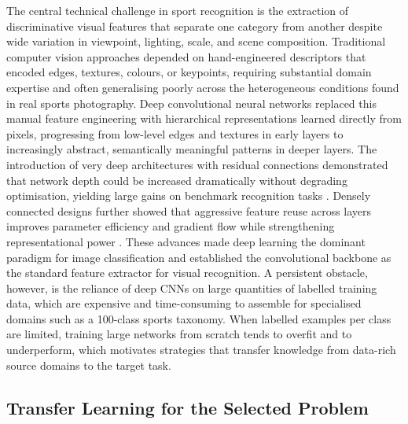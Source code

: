 The central technical challenge in sport recognition is the extraction of discriminative visual features that separate one category from another despite wide variation in viewpoint, lighting, scale, and scene composition.
Traditional computer vision approaches depended on hand-engineered descriptors that encoded edges, textures, colours, or keypoints, requiring substantial domain expertise and often generalising poorly across the heterogeneous conditions found in real sports photography.
Deep convolutional neural networks replaced this manual feature engineering with hierarchical representations learned directly from pixels, progressing from low-level edges and textures in early layers to increasingly abstract, semantically meaningful patterns in deeper layers.
The introduction of very deep architectures with residual connections demonstrated that network depth could be increased dramatically without degrading optimisation, yielding large gains on benchmark recognition tasks \citep{he2016resnet}.
Densely connected designs further showed that aggressive feature reuse across layers improves parameter efficiency and gradient flow while strengthening representational power \citep{huang2017densenet}.
These advances made deep learning the dominant paradigm for image classification and established the convolutional backbone as the standard feature extractor for visual recognition.
A persistent obstacle, however, is the reliance of deep CNNs on large quantities of labelled training data, which are expensive and time-consuming to assemble for specialised domains such as a 100-class sports taxonomy.
When labelled examples per class are limited, training large networks from scratch tends to overfit and to underperform, which motivates strategies that transfer knowledge from data-rich source domains to the target task.

\subsection{Transfer Learning for the Selected Problem}
\label{sec:intro-transfer}

